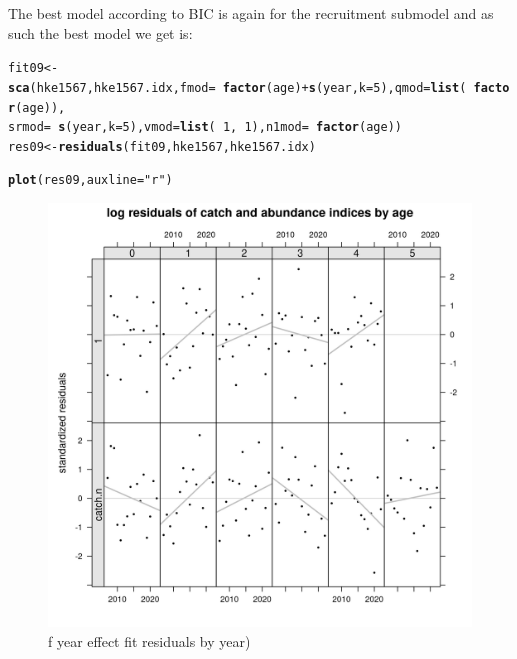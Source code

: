 \documentclass[a4paper,english,11pt]{article}\usepackage[]{graphicx}\usepackage[]{xcolor}
\makeatletter
\newcommand{\hlnum}[1]{\textcolor[rgb]{0.686,0.059,0.569}{#1}}%
\newcommand{\hlsng}[1]{\textcolor[rgb]{0.192,0.494,0.8}{#1}}%
\newcommand{\hlopt}[1]{\textcolor[rgb]{0,0,0}{#1}}%
\newcommand{\hldef}[1]{\textcolor[rgb]{0.345,0.345,0.345}{#1}}%
\newcommand{\hlkwb}[1]{\textcolor[rgb]{0.69,0.353,0.396}{#1}}%
\newcommand{\hlkwc}[1]{\textcolor[rgb]{0.333,0.667,0.333}{#1}}%
\newcommand{\hlkwd}[1]{\textcolor[rgb]{0.737,0.353,0.396}{\textbf{#1}}}%
\newenvironment{kframe}{%
 \def\at@end@of@kframe{}%
 \ifinner\ifhmode%
  \def\at@end@of@kframe{\end{minipage}}%
  \begin{minipage}{\columnwidth}%
 \fi\fi%
 \def\FrameCommand##1{\hskip\@totalleftmargin \hskip-\fboxsep
 \colorbox{shadecolor}{##1}\hskip-\fboxsep
     \hskip-\linewidth \hskip-\@totalleftmargin \hskip\columnwidth}%
 \MakeFramed {\advance\hsize-\width
   \@totalleftmargin\z@ \linewidth\hsize
   \@setminipage}}%
 {\par\unskip\endMakeFramed%
 \at@end@of@kframe}
\newenvironment{knitrout}{}{} %
\makeatother
\begin{document}
The best model according to BIC is again  for the recruitment submodel and as such the best model we get is:

\begin{knitrout}
\color{fgcolor}\begin{kframe}
\begin{alltt}
\hldef{fit09} \hlkwb{<-} \hlkwd{sca}\hldef{(hke1567, hke1567.idx,} \hlkwc{fmod} \hldef{=} \hlopt{~}\hlkwd{factor}\hldef{(age)} \hlopt{+} \hlkwd{s}\hldef{(year,} \hlkwc{k} \hldef{=} \hlnum{5}\hldef{),} \hlkwc{qmod} \hldef{=} \hlkwd{list}\hldef{(}\hlopt{~}\hlkwd{factor}\hldef{(age)),}
    \hlkwc{srmod} \hldef{=} \hlopt{~}\hlkwd{s}\hldef{(year,} \hlkwc{k} \hldef{=} \hlnum{5}\hldef{),} \hlkwc{vmod} \hldef{=} \hlkwd{list}\hldef{(}\hlopt{~}\hlnum{1}\hldef{,} \hlopt{~}\hlnum{1}\hldef{),} \hlkwc{n1mod} \hldef{=} \hlopt{~}\hlkwd{factor}\hldef{(age))}
\hldef{res09} \hlkwb{<-} \hlkwd{residuals}\hldef{(fit09, hke1567, hke1567.idx)}
\end{alltt}
\end{kframe}
\end{knitrout}

\begin{knitrout}
\color{fgcolor}\begin{kframe}
\begin{alltt}
\hlkwd{plot}\hldef{(res09,} \hlkwc{auxline} \hldef{=} \hlsng{"r"}\hldef{)}
\end{alltt}
\end{kframe}\begin{figure}[H]

{\centering \includegraphics[width=.9\linewidth]{figure/srksresbyyear-1} 

}

\caption[f year effect fit residuals by year)]{f year effect fit residuals by year)}\label{fig:srksresbyyear}
\end{figure}

\end{knitrout}
\end{document}
